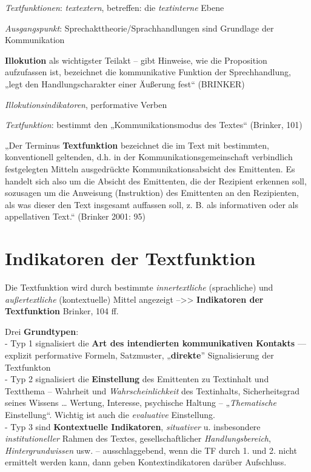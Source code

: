 \documentclass[
  letterpaper,
]{scrbook}
\begin{document}
\emph{Textfunktionen}: \emph{textextern}, betreffen: die
\emph{textinterne} Ebene

\emph{Ausgangspunkt}: Sprechakttheorie/Sprachhandlungen sind Grundlage
der Kommunikation

\textbf{Illokution} als wichtigster Teilakt -- gibt Hinweise, wie die
Proposition aufzufassen ist, bezeichnet die kommunikative Funktion der
Sprechhandlung, „legt den Handlungscharakter einer Äußerung fest``
(BRINKER)

\emph{Illokutionsindikatoren}, performative Verben

\emph{Textfunktion}: bestimmt den „Kommunikationsmodus des Textes``
(Brinker, 101)

„Der Terminus \textbf{Textfunktion} bezeichnet die im Text mit
bestimmten, konventionell geltenden, d.h. in der
Kommunikationsgemeinschaft verbindlich festgelegten Mitteln ausgedrückte
Kommunikationsabsicht des Emittenten. Es handelt sich also um die
Absicht des Emittenten, die der Rezipient erkennen soll, sozusagen um
die Anweisung (Instruktion) des Emittenten an den Rezipienten, als was
dieser den Text insgesamt auffassen soll, z. B. als informativen oder
als appellativen Text.`` (Brinker 2001: 95)

\hypertarget{indikatoren-der-textfunktion}{%
\section{Indikatoren der
Textfunktion}\label{indikatoren-der-textfunktion}}

Die Textfunktion wird durch bestimmte \emph{innertextliche}
(sprachliche) und \emph{außertextliche} (kontextuelle) Mittel angezeigt
--\textgreater\textgreater{} \textbf{Indikatoren der Textfunktion}
Brinker, 104 ff.

Drei \textbf{Grundtypen}:\\
- Typ 1 signalisiert die \textbf{Art des intendierten kommunikativen
Kontakts} --- explizit performative Formeln, Satzmuster,
„\textbf{direkte}'' Signalisierung der Textfunkton\\
- Typ 2 signalisiert die \textbf{Einstellung} des Emittenten zu
Textinhalt und Textthema -- Wahrheit und \emph{Wahrscheinlichkeit} des
Textinhalts, Sicherheitsgrad seines Wissens \ldots{} Wertung, Interesse,
psychische Haltung -- „\emph{Thematische} Einstellung``. Wichtig ist
auch die \emph{evaluative} Einstellung.\\
- Typ 3 sind \textbf{Kontextuelle Indikatoren}, \emph{situativer} u.
insbesondere \emph{institutioneller} Rahmen des Textes,
gesellschaftlicher \emph{Handlungsbereich}, \emph{Hintergrundwissen}
usw. -- ausschlaggebend, wenn die TF durch 1. und 2. nicht ermittelt
werden kann, dann geben Kontextindikatoren darüber Aufschluss.\\
\end{document}
